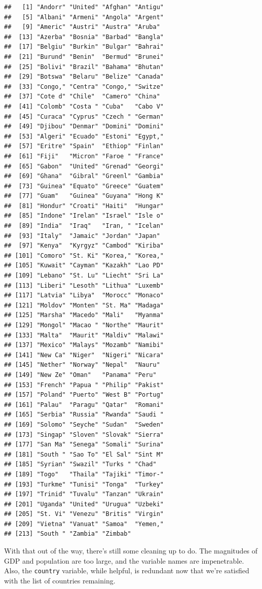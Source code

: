 \documentclass[12pt,oneside,openany]{tufte-book}
\begin{document}
\begin{verbatim}
##   [1] "Andorr" "United" "Afghan" "Antigu"
##   [5] "Albani" "Armeni" "Angola" "Argent"
##   [9] "Americ" "Austri" "Austra" "Aruba" 
##  [13] "Azerba" "Bosnia" "Barbad" "Bangla"
##  [17] "Belgiu" "Burkin" "Bulgar" "Bahrai"
##  [21] "Burund" "Benin"  "Bermud" "Brunei"
##  [25] "Bolivi" "Brazil" "Bahama" "Bhutan"
##  [29] "Botswa" "Belaru" "Belize" "Canada"
##  [33] "Congo," "Centra" "Congo," "Switze"
##  [37] "Cote d" "Chile"  "Camero" "China" 
##  [41] "Colomb" "Costa " "Cuba"   "Cabo V"
##  [45] "Curaca" "Cyprus" "Czech " "German"
##  [49] "Djibou" "Denmar" "Domini" "Domini"
##  [53] "Algeri" "Ecuado" "Estoni" "Egypt,"
##  [57] "Eritre" "Spain"  "Ethiop" "Finlan"
##  [61] "Fiji"   "Micron" "Faroe " "France"
##  [65] "Gabon"  "United" "Grenad" "Georgi"
##  [69] "Ghana"  "Gibral" "Greenl" "Gambia"
##  [73] "Guinea" "Equato" "Greece" "Guatem"
##  [77] "Guam"   "Guinea" "Guyana" "Hong K"
##  [81] "Hondur" "Croati" "Haiti"  "Hungar"
##  [85] "Indone" "Irelan" "Israel" "Isle o"
##  [89] "India"  "Iraq"   "Iran, " "Icelan"
##  [93] "Italy"  "Jamaic" "Jordan" "Japan" 
##  [97] "Kenya"  "Kyrgyz" "Cambod" "Kiriba"
## [101] "Comoro" "St. Ki" "Korea," "Korea,"
## [105] "Kuwait" "Cayman" "Kazakh" "Lao PD"
## [109] "Lebano" "St. Lu" "Liecht" "Sri La"
## [113] "Liberi" "Lesoth" "Lithua" "Luxemb"
## [117] "Latvia" "Libya"  "Morocc" "Monaco"
## [121] "Moldov" "Monten" "St. Ma" "Madaga"
## [125] "Marsha" "Macedo" "Mali"   "Myanma"
## [129] "Mongol" "Macao " "Northe" "Maurit"
## [133] "Malta"  "Maurit" "Maldiv" "Malawi"
## [137] "Mexico" "Malays" "Mozamb" "Namibi"
## [141] "New Ca" "Niger"  "Nigeri" "Nicara"
## [145] "Nether" "Norway" "Nepal"  "Nauru" 
## [149] "New Ze" "Oman"   "Panama" "Peru"  
## [153] "French" "Papua " "Philip" "Pakist"
## [157] "Poland" "Puerto" "West B" "Portug"
## [161] "Palau"  "Paragu" "Qatar"  "Romani"
## [165] "Serbia" "Russia" "Rwanda" "Saudi "
## [169] "Solomo" "Seyche" "Sudan"  "Sweden"
## [173] "Singap" "Sloven" "Slovak" "Sierra"
## [177] "San Ma" "Senega" "Somali" "Surina"
## [181] "South " "Sao To" "El Sal" "Sint M"
## [185] "Syrian" "Swazil" "Turks " "Chad"  
## [189] "Togo"   "Thaila" "Tajiki" "Timor-"
## [193] "Turkme" "Tunisi" "Tonga"  "Turkey"
## [197] "Trinid" "Tuvalu" "Tanzan" "Ukrain"
## [201] "Uganda" "United" "Urugua" "Uzbeki"
## [205] "St. Vi" "Venezu" "Britis" "Virgin"
## [209] "Vietna" "Vanuat" "Samoa"  "Yemen,"
## [213] "South " "Zambia" "Zimbab"
\end{verbatim}

With that out of the way, there's still some cleaning up to do. The
magnitudes of GDP and population are too large, and the variable names
are impenetrable. Also, the \texttt{country} variable, while helpful, is
redundant now that we're satisfied with the list of countries remaining.
\end{document}
